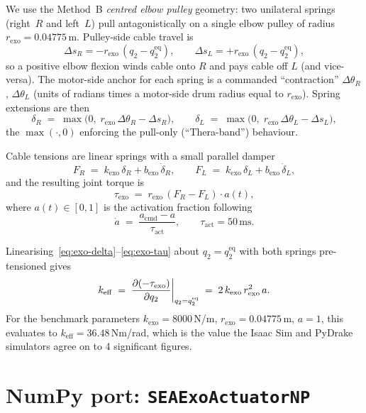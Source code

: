 \documentclass[11pt,a4paper]{article}
\newcommand{\rexo}{r_{\mathrm{exo}}}
\newcommand{\kexo}{k_{\mathrm{exo}}}
\newcommand{\keff}{k_{\mathrm{eff}}}
\begin{document}
We use the Method~B \emph{centred elbow pulley} geometry: two unilateral
springs (right~$R$ and left~$L$) pull antagonistically on a single
elbow pulley of radius $\rexo=0.04775$\,m.  Pulley-side cable travel is
\[
\Delta s_R = -\rexo\,(q_2-q_2^{\mathrm{eq}}),\qquad
\Delta s_L = +\rexo\,(q_2-q_2^{\mathrm{eq}}),
\]
so a positive elbow flexion winds cable onto $R$ and pays cable off
$L$ (and vice-versa).  The motor-side anchor for each spring is a
commanded ``contraction'' $\Delta\theta_R$, $\Delta\theta_L$ (units of
radians times a motor-side drum radius equal to $\rexo$).  Spring
extensions are then
\begin{equation}\label{eq:exo-delta}
\delta_R \;=\; \max\!\big(0,\; \rexo\,\Delta\theta_R - \Delta s_R\big),\qquad
\delta_L \;=\; \max\!\big(0,\; \rexo\,\Delta\theta_L - \Delta s_L\big),
\end{equation}
the $\max(\cdot,0)$ enforcing the pull-only (``Thera-band'') behaviour.

Cable tensions are linear springs with a small parallel damper
\begin{equation}\label{eq:exo-force}
F_R \;=\; \kexo\,\delta_R + b_{\mathrm{exo}}\,\dot{\delta}_R,\qquad
F_L \;=\; \kexo\,\delta_L + b_{\mathrm{exo}}\,\dot{\delta}_L,
\end{equation}
and the resulting joint torque is
\begin{equation}\label{eq:exo-tau}
\tau_{\mathrm{exo}} \;=\; \rexo\,(F_R - F_L)\cdot a(t),
\end{equation}
where $a(t)\in[0,1]$ is the activation fraction following
\begin{equation}\label{eq:exo-act}
\dot{a} \;=\; \frac{a_{\mathrm{cmd}} - a}{\tau_{\mathrm{act}}},
\qquad \tau_{\mathrm{act}}=50\,\mathrm{ms}.
\end{equation}

\begin{resultbox}
Linearising~\eqref{eq:exo-delta}--\eqref{eq:exo-tau} about $q_2=q_2^{\mathrm{eq}}$
with both springs pre-tensioned gives
\[
\keff \;=\; \pdv{(-\tau_{\mathrm{exo}})}{q_2}\bigg|_{q_2=q_2^{\mathrm{eq}}}
        \;=\; 2\,\kexo\,\rexo^{2}\,a.
\]
For the benchmark parameters
$\kexo=8000$\,N/m, $\rexo=0.04775$\,m, $a=1$, this evaluates to
$\keff = 36.48$\,Nm/rad, which is the value the Isaac Sim and PyDrake
simulators agree on to 4 significant figures.
\end{resultbox}

\section{NumPy port: \texttt{SEAExoActuatorNP}}
\end{document}
